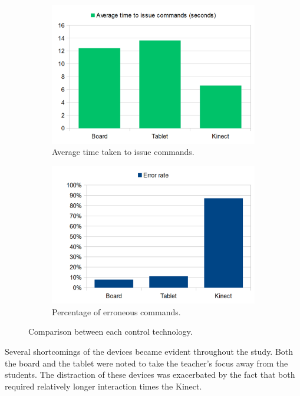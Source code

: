 \documentclass[manuscript, review, screen]{acmart}
\begin{document}
\begin{figure}[t]
	\centering
	\begin{subfigure}[t]{0.45\textwidth}
		\centering
		\includegraphics[width=\textwidth]{figures/bar_chart_average_time.png}
		\caption{Average time taken to issue commands.}
		\label{fig:averageTime}
	\end{subfigure}
	\begin{subfigure}[t]{0.45\textwidth}
		\centering
		\includegraphics[width=\textwidth]{figures/bar_chart_error_rate.png}
		\caption{Percentage of erroneous commands.}
		\label{fig:errorRates}
	\end{subfigure}
   	\caption{Comparison between each control technology.}
   	\label{fig:graphs}
\end{figure} 

Several shortcomings of the devices became evident throughout the study.
Both the board and the tablet were noted to take the teacher's focus away from the students.
The distraction of these devices was exacerbated by the fact that both required relatively longer interaction times the Kinect.
\end{document}
